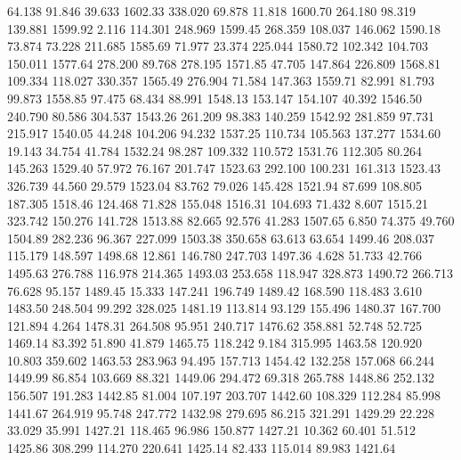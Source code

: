   64.138   91.846   39.633      1602.33
 338.020   69.878   11.818      1600.70
 264.180   98.319  139.881      1599.92
   2.116  114.301  248.969      1599.45
 268.359  108.037  146.062      1590.18
  73.874   73.228  211.685      1585.69
  71.977   23.374  225.044      1580.72
 102.342  104.703  150.011      1577.64
 278.200   89.768  278.195      1571.85
  47.705  147.864  226.809      1568.81
 109.334  118.027  330.357      1565.49
 276.904   71.584  147.363      1559.71
  82.991   81.793   99.873      1558.85
  97.475   68.434   88.991      1548.13
 153.147  154.107   40.392      1546.50
 240.790   80.586  304.537      1543.26
 261.209   98.383  140.259      1542.92
 281.859   97.731  215.917      1540.05
  44.248  104.206   94.232      1537.25
 110.734  105.563  137.277      1534.60
  19.143   34.754   41.784      1532.24
  98.287  109.332  110.572      1531.76
 112.305   80.264  145.263      1529.40
  57.972   76.167  201.747      1523.63
 292.100  100.231  161.313      1523.43
 326.739   44.560   29.579      1523.04
  83.762   79.026  145.428      1521.94
  87.699  108.805  187.305      1518.46
 124.468   71.828  155.048      1516.31
 104.693   71.432    8.607      1515.21
 323.742  150.276  141.728      1513.88
  82.665   92.576   41.283      1507.65
   6.850   74.375   49.760      1504.89
 282.236   96.367  227.099      1503.38
 350.658   63.613   63.654      1499.46
 208.037  115.179  148.597      1498.68
  12.861  146.780  247.703      1497.36
   4.628   51.733   42.766      1495.63
 276.788  116.978  214.365      1493.03
 253.658  118.947  328.873      1490.72
 266.713   76.628   95.157      1489.45
  15.333  147.241  196.749      1489.42
 168.590  118.483    3.610      1483.50
 248.504   99.292  328.025      1481.19
 113.814   93.129  155.496      1480.37
 167.700  121.894    4.264      1478.31
 264.508   95.951  240.717      1476.62
 358.881   52.748   52.725      1469.14
  83.392   51.890   41.879      1465.75
 118.242    9.184  315.995      1463.58
 120.920   10.803  359.602      1463.53
 283.963   94.495  157.713      1454.42
 132.258  157.068   66.244      1449.99
  86.854  103.669   88.321      1449.06
 294.472   69.318  265.788      1448.86
 252.132  156.507  191.283      1442.85
  81.004  107.197  203.707      1442.60
 108.329  112.284   85.998      1441.67
 264.919   95.748  247.772      1432.98
 279.695   86.215  321.291      1429.29
  22.228   33.029   35.991      1427.21
 118.465   96.986  150.877      1427.21
  10.362   60.401   51.512      1425.86
 308.299  114.270  220.641      1425.14
  82.433  115.014   89.983      1421.64
